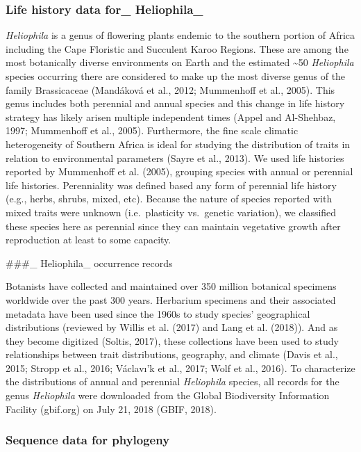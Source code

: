 \documentclass[man,floatsintext]{apa6}
\theoremstyle{definition}
\theoremstyle{definition}
\theoremstyle{definition}
\theoremstyle{remark}
\begin{document}
\hypertarget{life-history-data-for_-heliophila_}{%
\subsubsection{Life history data for\_
Heliophila\_}\label{life-history-data-for_-heliophila_}}

\emph{Heliophila} is a genus of flowering plants endemic to the southern
portion of Africa including the Cape Floristic and Succulent Karoo
Regions. These are among the most botanically diverse environments on
Earth and the estimated \textasciitilde{}50 \emph{Heliophila} species
occurring there are considered to make up the most diverse genus of the
family Brassicaceae (Mandáková et al., 2012; Mummenhoff et al., 2005).
This genus includes both perennial and annual species and this change in
life history strategy has likely arisen multiple independent times
(Appel and Al-Shehbaz, 1997; Mummenhoff et al., 2005). Furthermore, the
fine scale climatic heterogeneity of Southern Africa is ideal for
studying the distribution of traits in relation to environmental
parameters (Sayre et al., 2013). We used life histories reported by
Mummenhoff et al. (2005), grouping species with annual or perennial life
histories. Perenniality was defined based any form of perennial life
history (e.g., herbs, shrubs, mixed, etc). Because the nature of species
reported with mixed traits were unknown (i.e.~plasticity vs.~genetic
variation), we classified these species here as perennial since they can
maintain vegetative growth after reproduction at least to some capacity.

\#\#\#\_ Heliophila\_ occurrence records

Botanists have collected and maintained over 350 million botanical
specimens worldwide over the past 300 years. Herbarium specimens and
their associated metadata have been used since the 1960s to study
species' geographical distributions (reviewed by Willis et al. (2017)
and Lang et al. (2018)). And as they become digitized (Soltis, 2017),
these collections have been used to study relationships between trait
distributions, geography, and climate (Davis et al., 2015; Stropp et
al., 2016; Václavı'k et al., 2017; Wolf et al., 2016). To characterize
the distributions of annual and perennial \emph{Heliophila} species, all
records for the genus \emph{Heliophila} were downloaded from the Global
Biodiversity Information Facility (gbif.org) on July 21, 2018 (GBIF,
2018).

\hypertarget{sequence-data-for-phylogeny}{%
\subsubsection{Sequence data for
phylogeny}\label{sequence-data-for-phylogeny}}
\end{document}

